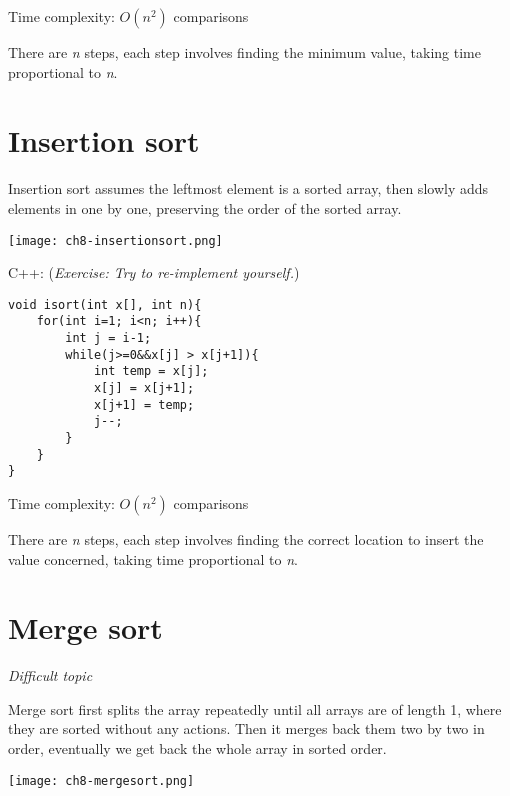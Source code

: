 Time complexity: $O(n^2)$ comparisons


There are \textit{n} steps, each step involves finding the minimum value, taking time proportional to \textit{n}.

\pagebreak

\section{Insertion sort}

Insertion sort assumes the leftmost element is a sorted array, then slowly adds elements in one by one, preserving the order of the sorted array.

\texttt{[image: ch8-insertionsort.png]}



% 
\pagebreak

C++: (\textit{Exercise: Try to re-implement yourself.})
\begin{lstlisting}
void isort(int x[], int n){
    for(int i=1; i<n; i++){
        int j = i-1;
        while(j>=0&&x[j] > x[j+1]){
            int temp = x[j];
            x[j] = x[j+1];
            x[j+1] = temp;
            j--;
        }
    }
}
\end{lstlisting}

Time complexity: $O(n^2)$ comparisons


There are \textit{n} steps, each step involves finding the correct location to insert the value concerned, taking time proportional to \textit{n}.

\pagebreak

\section{Merge sort}

\textit{Difficult topic}


Merge sort first splits the array repeatedly until all arrays are of length 1, where they are sorted without any actions. Then it merges back them two by two in order, eventually we get back the whole array in sorted order.

\texttt{[image: ch8-mergesort.png]}

